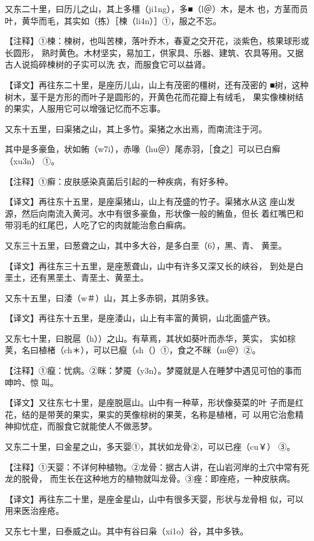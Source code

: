 \documentclass[a4paper,12pt,UTF8,twoside]{ctexbook}
\begin{document}
又东二十里，曰历儿之山，其上多橿（ji1ng），多■（l＠）木，是木 也，方茎而员叶，黄华而毛，其实如（拣）［楝（li4n）］①，服之不忘。

【注释】①楝：楝树，也叫苦楝，落叶乔木，春夏之交开花，淡紫色，核果球形或长圆形， 熟时黄色。木材坚实，易加工，供家具、乐器、建筑、农具等用。又据古人说捣碎楝树的子实可以洗 衣，而服食它可以益肾。

【译文】再往东二十里，是座历儿山，山上有茂密的橿树，还有茂密的 ■树，这种树木，茎干是方形的而叶子是圆形的，开黄色花而花瓣上有绒毛， 果实像楝树结的果实，人服用它可以增强记忆而不忘事。

又东十五里，曰渠猪之山，其上多竹。渠猪之水出焉，而南流注于河。

其中是多豪鱼，状如鲔（w7i），赤喙（hu＠）尾赤羽，［食之］可以已白癣（xu3n） ①。

【注释】①癣：皮肤感染真菌后引起的一种疾病，有好多种。

【译文】再往东十五里，是座渠猪山，山上有茂盛的竹子。渠猪水从这 座山发源，然后向南流入黄河。水中有很多豪鱼，形状像一般的鲔鱼，但长 着红嘴巴和带羽毛的红尾巴，人吃了它的肉就能治愈白癣病。

又东三十五里，曰葱聋之山，其中多大谷，是多白垩（6），黑、青、 黄垩。

【译文】再往东三十五里，是座葱聋山，山中有许多又深又长的峡谷， 到处是白垩土，还有黑垩土、青垩土、黄垩土。

又东十五里，曰涹（w＃）山，其上多赤铜，其阴多铁。

【译文】再往东十五里，是座涹山，山上有丰富的黄铜，山北面盛产铁。

又东七十里，曰脱扈（h））之山。有草焉，其状如葵叶而赤华，荚实， 实如棕荚，名曰植楮（ch＊），可以已癙（sh（）①，食之不眯（m＠）②。

【注释】①癙：忧病。②眯：梦魇（y3n）。梦魇就是人在睡梦中遇见可怕的事而呻吟、惊 叫。

【译文】又往东七十里，是座脱扈山。山中有一种草，形状像葵菜的叶 子而是红花，结的是带荚的果实，果实的荚像棕树的果荚，名称是植楮，可 以用它治愈精神抑忧症，而服食它就能使人不做恶梦。

又东二十里，曰金星之山，多天婴①，其状如龙骨②，可以已痤（cu￥） ③。

【注释】①天婴：不详何种植物。②龙骨：据古人讲，在山岩河岸的土穴中常有死龙的脱骨， 而生长在这种地方的植物就叫龙骨。③痤：即痤疮，一种皮肤病。

【译文】再往东二十里，是座金星山，山中有很多天婴，形状与龙骨相 似，可以用来医治痤疮。

又东七十里，曰泰威之山。其中有谷曰枭（xi1o）谷，其中多铁。
\end{document}
